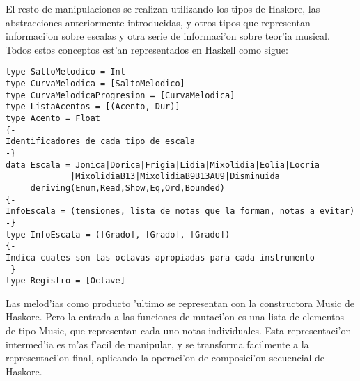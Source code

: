 El resto de manipulaciones se realizan utilizando los tipos de Haskore, las abstracciones anteriormente introducidas, y otros tipos que representan informaci'on sobre escalas y otra serie de informaci'on sobre teor'ia musical. Todos estos conceptos est'an representados en Haskell como sigue:
        \begin{verbatim}
type SaltoMelodico = Int
type CurvaMelodica = [SaltoMelodico]
type CurvaMelodicaProgresion = [CurvaMelodica]
type ListaAcentos = [(Acento, Dur)]
type Acento = Float 
{-
Identificadores de cada tipo de escala
-}
data Escala = Jonica|Dorica|Frigia|Lidia|Mixolidia|Eolia|Locria
             |MixolidiaB13|MixolidiaB9B13AU9|Disminuida
     deriving(Enum,Read,Show,Eq,Ord,Bounded)
{-
InfoEscala = (tensiones, lista de notas que la forman, notas a evitar)
-}
type InfoEscala = ([Grado], [Grado], [Grado])
{-
Indica cuales son las octavas apropiadas para cada instrumento
-}
type Registro = [Octave]
        \end{verbatim}

Las melod'ias como producto 'ultimo se representan con la constructora Music de Haskore. Pero la entrada a las funciones de mutaci'on es una lista de elementos de tipo Music, que representan cada uno notas individuales. Esta representaci'on intermed'ia es m'as f'acil de manipular, y se transforma facilmente a la representaci'on final, aplicando la operaci'on de composici'on secuencial de Haskore.

